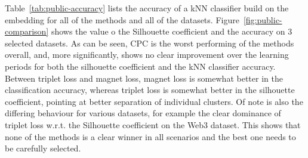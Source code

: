 Table~\ref{tab:public-accuracy} lists the accuracy of a kNN classifier build on the embedding for all of the methods and all of the datasets. Figure~\ref{fig:public-comparison} shows the value o the Silhouette coefficient and the accuracy on 3 selected datasets. As can be seen, CPC is the worst performing of the methods overall, and, more significantly, shows no clear improvement over the learning periods for both the silhouette coefficient and the kNN classifier accuracy. Between triplet loss and magnet loss, magnet loss is somewhat better in the classification accuracy, whereas triplet loss is somewhat better in the silhouette coefficient, pointing at better separation of individual clusters. Of note is also the differing behaviour for various datasets, for example the clear dominance of triplet loss w.r.t. the Silhouette coefficient on the Web3 dataset. This shows that none of the methods is a clear winner in all scenarios and the best one needs to be carefully selected.

